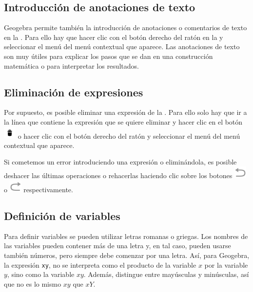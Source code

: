 \subsection*{Introducción de anotaciones de texto}
Geogebra permite también la introducción de anotaciones o comentarios de texto en la .
Para ello hay que hacer clic con el botón derecho del ratón en la  y seleccionar el menú  del menú contextual que aparece.
Las anotaciones de texto son muy útiles para explicar los pasos que se dan en una construcción matemática o para interpretar los resultados.


\subsection*{Eliminación de expresiones}
Por supuesto, es posible eliminar una expresión de la .
Para ello solo hay que ir a la línea que contiene la expresión que se quiere eliminar y hacer clic en el botón \includegraphics[scale=0.035]{img/introduccion/bin-button.png} o hacer clic con el botón derecho del ratón y seleccionar el menú  del menú contextual que aparece.

Si cometemos un error introduciendo una expresión o eliminándola, es posible deshacer las últimas operaciones o rehacerlas haciendo clic sobre los botones \includegraphics[scale=0.03]{img/introduccion/undo-button.png} o \includegraphics[scale=0.03]{img/introduccion/redo-button.png} respectivamente.


\subsection*{Definición de variables}
Para definir variables se pueden utilizar letras romanas o griegas.
Los nombres de las variables pueden contener más de una letra y, en tal caso, pueden usarse también números, pero siempre debe comenzar por una letra.
Así, para Geogebra, la expresión \texttt{xy}, no se interpreta como el producto de la variable $x$ por la variable $y$, sino como la variable $xy$.
Además, distingue entre mayúsculas y minúsculas, así que no es lo mismo $xy$ que $xY$.



